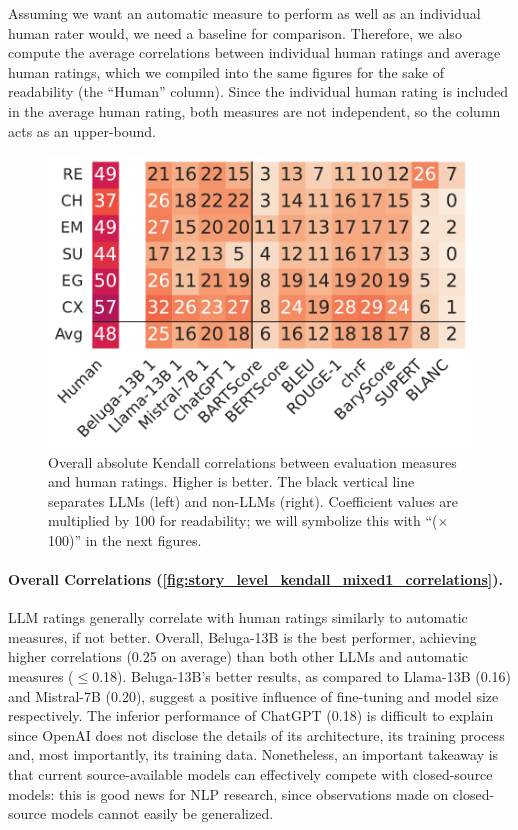 Assuming we want an automatic measure to perform as well as an individual human rater would, we need a baseline for comparison. Therefore, we also compute the average correlations between individual human ratings and average human ratings, which we compiled into the same figures for the sake of readability (the ``Human'' column). Since the individual human rating is included in the average human rating, both measures are not independent, so the column acts as an upper-bound.

\begin{figure}[!h]
    \centering
    \includegraphics[width=0.8\columnwidth]{pictures/llm_mixed1_story_kendall.pdf}
    \caption{Overall absolute Kendall correlations between evaluation measures and human ratings. Higher is better. The black vertical line separates LLMs (left) and non-LLMs (right). Coefficient values are multiplied by 100 for readability; we will symbolize this with ``($\times$100)'' in the next figures.}
    \label{fig:story_level_kendall_mixed1_correlations}
\end{figure}

\paragraph{Overall Correlations (\autoref{fig:story_level_kendall_mixed1_correlations}).}
LLM ratings generally correlate with human ratings similarly to automatic measures, if not better. Overall, Beluga-13B is the best performer, achieving higher correlations (0.25 on average) than both other LLMs and automatic measures ($\leq$0.18). Beluga-13B's better results, as compared to Llama-13B (0.16) and Mistral-7B (0.20), suggest a positive influence of fine-tuning and model size respectively. The inferior performance of ChatGPT (0.18) is difficult to explain since OpenAI does not disclose the details of its architecture, its training process and, most importantly, its training data. Nonetheless, an important takeaway is that current source-available models can effectively compete with closed-source models: this is good news for NLP research, since observations made on closed-source models cannot easily be generalized.

